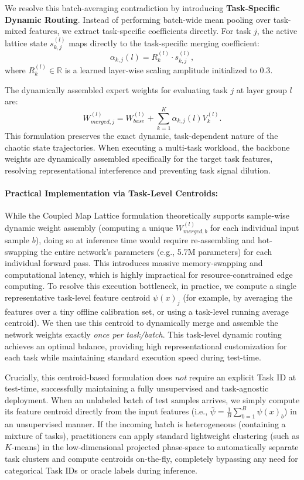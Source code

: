 We resolve this batch-averaging contradiction by introducing \textbf{Task-Specific Dynamic Routing}. Instead of performing batch-wide mean pooling over task-mixed features, we extract task-specific coefficients directly. For task $j$, the active lattice state $s_{k, j}^{(l)}$ maps directly to the task-specific merging coefficient:
\begin{equation}
\alpha_{k, j}(l) = R_k^{(l)} \cdot s_{k, j}^{(l)},
\end{equation}
where $R_k^{(l)} \in \mathbb{R}$ is a learned layer-wise scaling amplitude initialized to $0.3$.

The dynamically assembled expert weights for evaluating task $j$ at layer group $l$ are:
\begin{equation}
W_{merged, j}^{(l)} = W_{base}^{(l)} + \sum_{k=1}^K \alpha_{k, j}(l) V_k^{(l)}.
\end{equation}
This formulation preserves the exact dynamic, task-dependent nature of the chaotic state trajectories. When executing a multi-task workload, the backbone weights are dynamically assembled specifically for the target task features, resolving representational interference and preventing task signal dilution.

\paragraph{Practical Implementation via Task-Level Centroids:}
While the Coupled Map Lattice formulation theoretically supports sample-wise dynamic weight assembly (computing a unique $W_{merged, b}^{(l)}$ for each individual input sample $b$), doing so at inference time would require re-assembling and hot-swapping the entire network's parameters (e.g., 5.7M parameters) for each individual forward pass. This introduces massive memory-swapping and computational latency, which is highly impractical for resource-constrained edge computing. To resolve this execution bottleneck, in practice, we compute a single representative task-level feature centroid $\psi(x)_j$ (for example, by averaging the features over a tiny offline calibration set, or using a task-level running average centroid). We then use this centroid to dynamically merge and assemble the network weights exactly \emph{once per task/batch}. This task-level dynamic routing achieves an optimal balance, providing high representational customization for each task while maintaining standard execution speed during test-time.

Crucially, this centroid-based formulation does \emph{not} require an explicit Task ID at test-time, successfully maintaining a fully unsupervised and task-agnostic deployment. When an unlabeled batch of test samples arrives, we simply compute its feature centroid directly from the input features (i.e., $\bar{\psi} = \frac{1}{B} \sum_{b=1}^B \psi(x)_b$) in an unsupervised manner. If the incoming batch is heterogeneous (containing a mixture of tasks), practitioners can apply standard lightweight clustering (such as $K$-means) in the low-dimensional projected phase-space to automatically separate task clusters and compute centroids on-the-fly, completely bypassing any need for categorical Task IDs or oracle labels during inference.

